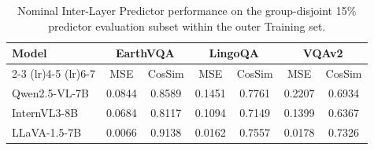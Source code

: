 \begin{table}[!ht]
  \centering
  \caption{Nominal Inter-Layer Predictor performance on the group-disjoint 15\% predictor evaluation subset within the outer Training set.}
  \label{tab:fault_free_predictor_performance}
  \small
  \begin{tabular}{lcccccc}
    \toprule
    \multirow{2}{*}{Model}
      & \multicolumn{2}{c}{EarthVQA}
      & \multicolumn{2}{c}{LingoQA}
      & \multicolumn{2}{c}{VQAv2} \\
    \cmidrule(lr){2-3}
    \cmidrule(lr){4-5}
    \cmidrule(lr){6-7}
      & MSE & CosSim
      & MSE & CosSim
      & MSE & CosSim \\
    \midrule
    Qwen2.5-VL-7B
      & 0.0844 & 0.8589
      & 0.1451 & 0.7761
      & 0.2207 & 0.6934 \\
    InternVL3-8B
      & 0.0684 & 0.8117
      & 0.1094 & 0.7149
      & 0.1399 & 0.6367 \\
    LLaVA-1.5-7B
      & 0.0066 & 0.9138
      & 0.0162 & 0.7557
      & 0.0178 & 0.7326 \\
    \bottomrule
  \end{tabular}
\end{table}


